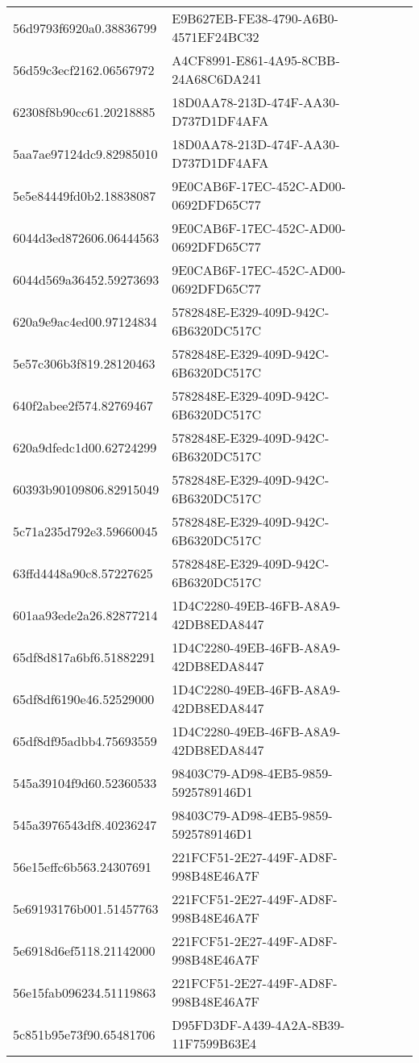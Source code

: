 \begin{tabular}{ll}
56d9793f6920a0.38836799 & E9B627EB-FE38-4790-A6B0-4571EF24BC32 \\
56d59c3ecf2162.06567972 & A4CF8991-E861-4A95-8CBB-24A68C6DA241 \\
62308f8b90cc61.20218885 & 18D0AA78-213D-474F-AA30-D737D1DF4AFA \\
5aa7ae97124dc9.82985010 & 18D0AA78-213D-474F-AA30-D737D1DF4AFA \\
5e5e84449fd0b2.18838087 & 9E0CAB6F-17EC-452C-AD00-0692DFD65C77 \\
6044d3ed872606.06444563 & 9E0CAB6F-17EC-452C-AD00-0692DFD65C77 \\
6044d569a36452.59273693 & 9E0CAB6F-17EC-452C-AD00-0692DFD65C77 \\
620a9e9ac4ed00.97124834 & 5782848E-E329-409D-942C-6B6320DC517C \\
5e57c306b3f819.28120463 & 5782848E-E329-409D-942C-6B6320DC517C \\
640f2abee2f574.82769467 & 5782848E-E329-409D-942C-6B6320DC517C \\
620a9dfedc1d00.62724299 & 5782848E-E329-409D-942C-6B6320DC517C \\
60393b90109806.82915049 & 5782848E-E329-409D-942C-6B6320DC517C \\
5c71a235d792e3.59660045 & 5782848E-E329-409D-942C-6B6320DC517C \\
63ffd4448a90c8.57227625 & 5782848E-E329-409D-942C-6B6320DC517C \\
601aa93ede2a26.82877214 & 1D4C2280-49EB-46FB-A8A9-42DB8EDA8447 \\
65df8d817a6bf6.51882291 & 1D4C2280-49EB-46FB-A8A9-42DB8EDA8447 \\
65df8df6190e46.52529000 & 1D4C2280-49EB-46FB-A8A9-42DB8EDA8447 \\
65df8df95adbb4.75693559 & 1D4C2280-49EB-46FB-A8A9-42DB8EDA8447 \\
545a39104f9d60.52360533 & 98403C79-AD98-4EB5-9859-5925789146D1 \\
545a3976543df8.40236247 & 98403C79-AD98-4EB5-9859-5925789146D1 \\
56e15effc6b563.24307691 & 221FCF51-2E27-449F-AD8F-998B48E46A7F \\
5e69193176b001.51457763 & 221FCF51-2E27-449F-AD8F-998B48E46A7F \\
5e6918d6ef5118.21142000 & 221FCF51-2E27-449F-AD8F-998B48E46A7F \\
56e15fab096234.51119863 & 221FCF51-2E27-449F-AD8F-998B48E46A7F \\
5c851b95e73f90.65481706 & D95FD3DF-A439-4A2A-8B39-11F7599B63E4 \\

\end{tabular}
